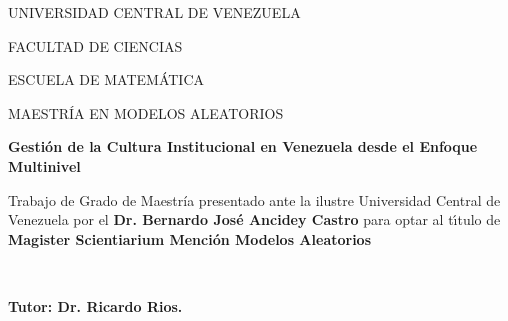 
\thispagestyle{empty}


\begin{center}

\vspace*{-1.5cm}


\vspace{.5cm}

\begin{small}
UNIVERSIDAD CENTRAL DE VENEZUELA

\vspace{-0.1cm}

FACULTAD DE CIENCIAS

\vspace{-0.1cm}

ESCUELA DE MATEM\'ATICA

\vspace{-0.1cm}

MAESTR\'IA EN MODELOS ALEATORIOS

\vspace{-0.1cm}

\end{small}

\vspace{2cm}

\begin{Huge}

{\bf Gesti\'on de la Cultura Institucional en Venezuela desde el Enfoque Multinivel}

{\bf }


\end{Huge}

\end{center}

\vspace{2cm}

\hspace{6cm}
\begin{minipage}[t]{9cm}
Trabajo de Grado de Maestr\'ia presentado ante la ilustre Universidad Central de Venezuela por el
\textbf{Dr. Bernardo José Ancidey Castro} para optar al t\'{\i}tulo de \textbf{Magister Scientiarium Menci\'on Modelos Aleatorios}

\

\textbf{Tutor: Dr. Ricardo Rios.}
\end{minipage}




